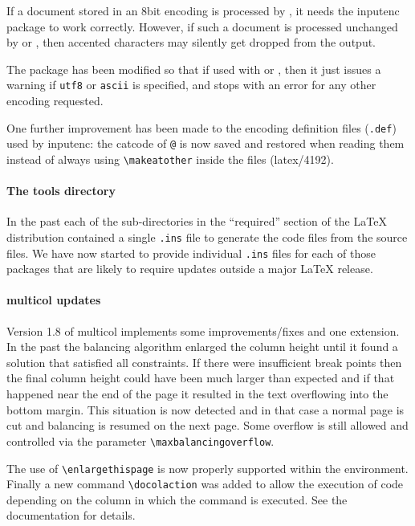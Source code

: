 \documentclass{ltnews}
\begin{document}
If a document stored in an 8bit encoding is processed by
, it needs the \textsf{inputenc} package to work
correctly. However, if such a document is processed unchanged by
 or , then accented characters may
silently get dropped from the output.

The package has been modified so that if used with  or
, then it just issues a warning if \texttt{utf8} or
\texttt{ascii} is specified, and stops with an error for any other
encoding requested.



One further improvement has been made to the encoding definition files
(\texttt{.def}) used by \textsf{inputenc}: the catcode of \texttt{@}
is now saved and restored when reading them instead of always using
\verb=\makeatother= inside the files (latex/4192).



\paragraph{The tools directory}

In the past each of the sub-directories in the ``required'' section of
the \LaTeX{} distribution contained a single \texttt{.ins} file to
generate the code files from the source files. We have now
started to provide individual \texttt{.ins} files for each of those
packages that are likely to require updates outside a major
\LaTeX{} release.

\paragraph{\textsf{multicol} updates}

Version 1.8 of \textsf{multicol} implements some improvements/fixes
and one extension. In the past the balancing algorithm enlarged the
column height until it found a solution that satisfied all
constraints. If there were insufficient break points then the final
column height could have been much larger than expected and if that
happened near the end of the page it resulted in the text overflowing
into the bottom margin. This situation is now detected and in that
case a normal page is cut and balancing is resumed on the next
page. Some overflow is still allowed and controlled via the parameter
\verb=\maxbalancingoverflow=.

The use of \verb=\enlargethispage= is now properly supported within
the environment. Finally a new command \verb=\docolaction= was added
to allow the execution of code depending on the column in which the
command is executed. See the documentation for details.
\end{document}
